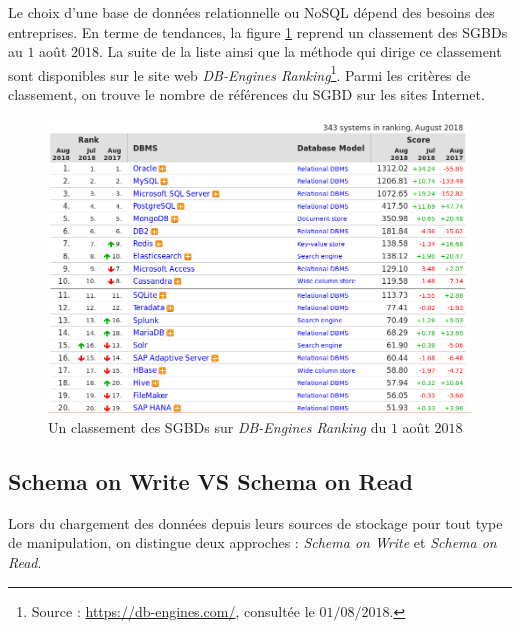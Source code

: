		
		
		Le choix d'une base de données relationnelle ou NoSQL dépend des besoins des entreprises. En terme de tendances, la figure \ref{fig:ranking-db} reprend un classement des SGBDs au $1$ août $ 2018 $. La suite de la liste ainsi que  la méthode qui dirige ce classement sont    disponibles sur le site  web \textit{DB-Engines Ranking}\footnote{Source : \url{https://db-engines.com/},  consultée le $01/08/2018$.}. Parmi les critères de classement, on trouve le nombre de références du SGBD sur les sites Internet. 
		
		
		\begin{figure}[H]
			\centering
			\captionsetup{justification=centering}
			\includegraphics[width=1\linewidth]{illustrations/ranking-db}
			\caption{Un classement des SGBDs sur \textit{DB-Engines Ranking} du $1$ août $2018$ }
			\label{fig:ranking-db}
		\end{figure}
		
		
		
		\subsection{Schema on Write VS Schema on Read} \label{sec:schema-read-write}
		
		Lors du chargement des données depuis leurs sources de stockage pour tout type de manipulation, on distingue deux approches : \textit{ Schema on Write} et \textit{Schema on Read}.
		
